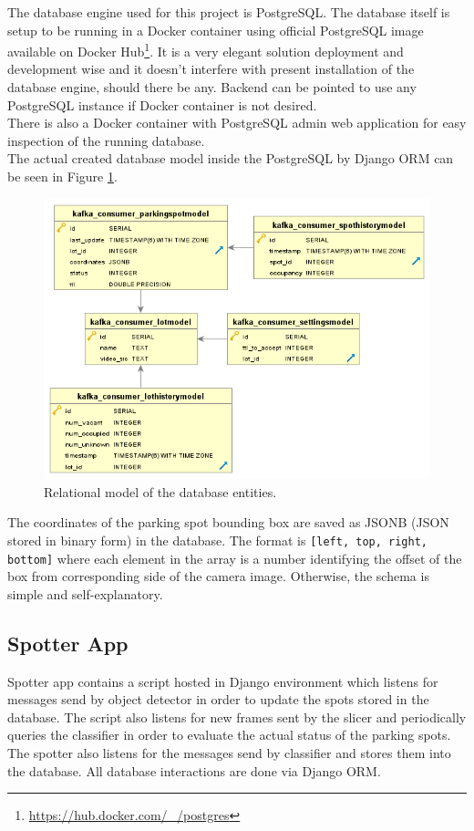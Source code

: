 \documentclass[thesis=M,english]{FITthesis}[2019/03/06]
\begin{document}
The database engine used for this project is PostgreSQL. The database itself is setup to be running in a Docker container using official PostgreSQL image available on Docker Hub\footnote{\url{https://hub.docker.com/_/postgres}}. It is a very elegant solution deployment and development wise and it doesn't interfere with present installation of the database engine, should there be any. Backend can be pointed to use any PostgreSQL instance if Docker container is not desired.\\


There is also a Docker container with PostgreSQL admin web application for easy inspection of the running database.\\


The actual created database model inside the PostgreSQL by Django ORM can be seen in Figure \ref{label:relational_model}.\\

\begin{figure}[ht!]
	\centering
	\includegraphics[width=\textwidth]{imgs/parkschema2.png}
	\caption{Relational model of the database entities.}
	\label{label:relational_model}
\end{figure}

The coordinates of the parking spot bounding box are saved as JSONB (JSON stored in binary form) in the database. The format is \texttt{[left, top, right, bottom]} where each element in the array is a number identifying the offset of the box from corresponding side of the camera image. Otherwise, the schema is simple and self-explanatory.
\subsection{Spotter App}
Spotter app contains a script hosted in Django environment which listens for messages send by object detector in order to update the spots stored in the database. The script also listens for new frames sent by the slicer and periodically queries the classifier in order to evaluate the actual status of the parking spots. The spotter also listens for the messages send by classifier and stores them into the database. All database interactions are done via Django ORM.\\
\end{document}
